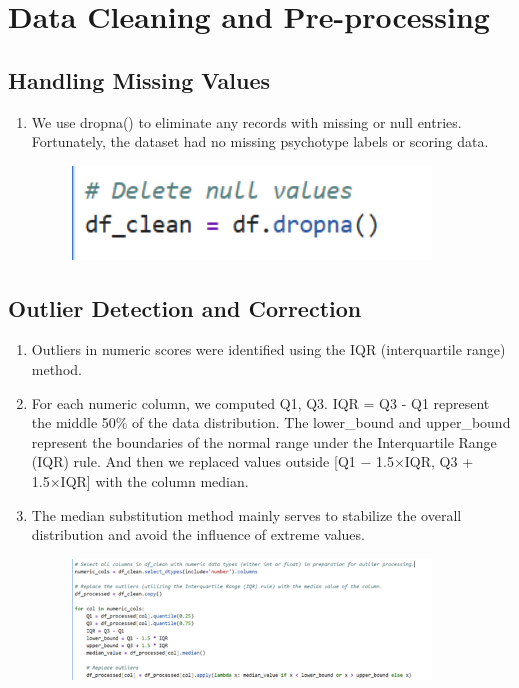 \documentclass[12pt]{article}
\begin{document}
	\section{Data Cleaning and Pre-processing}
	\subsection{Handling Missing Values}
	\begin{enumerate}
		\item We use dropna() to eliminate any records with missing or null entries. Fortunately, the dataset had no missing psychotype labels or scoring data.
			\begin{figure}[H]
			\centering
			\includegraphics[width=0.9\textwidth]{Q1P4}
			
		\end{figure}
	\end{enumerate}
	\subsection{Outlier Detection and Correction}
	\begin{enumerate}
		\item Outliers in numeric scores were identified using the IQR (interquartile range) method.
		\item For each numeric column, we computed Q1, Q3. IQR = Q3 - Q1 represent the middle 50\% of the data distribution. The lower\_bound and upper\_bound represent the boundaries of the normal range under the Interquartile Range (IQR) rule. And then we replaced values outside [Q1 − 1.5×IQR, Q3 + 1.5×IQR] with the column median. 
		\item The median substitution method mainly serves to stabilize the overall distribution and avoid the influence of extreme values.
		\begin{figure}[H]
			\centering
			\includegraphics[width=0.9\textwidth]{Q1P5}
			
		\end{figure}
	\end{enumerate}
\end{document}
